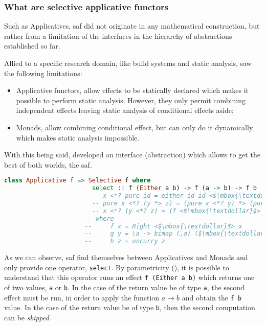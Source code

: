 \documentclass[
  oneside,
  11pt, a4paper,
  footinclude=true,
  headinclude=true,
  cleardoublepage=empty
]{scrbook}
\theoremstyle{definition}
\theoremstyle{definition}
\begin{document}
	        \subsubsection{What are selective applicative functors}
	       
	            Such as Applicatives, \gls{saf} did not originate in any mathematical construction, but rather from a limitation of the interfaces in the hierarchy of abstractions established so far.
	            
	            Allied to a specific research domain, like build systems and static analysis, \cite{andrey2019selective} saw the following limitations:
	            
	            \begin{itemize}
	                \item Applicative functors, allow effects to be statically declared which makes it possible to perform static analysis. However, they only permit combining independent effects leaving static analysis of conditional effects aside;
	                \item Monads, allow combining conditional effect, but can only do it dynamically which makes static analysis impossible.
	            \end{itemize}{}
	            
	            With this being said, \cite{andrey2019selective} developed an interface (abstraction) which allows to get the best of both worlds, the \gls{saf}.
	            
	            \begin{lstlisting}[mathescape, language=Haskell, label={lst:saf}, caption={Selective Applicative Functor laws},captionpos=b]
	                class Applicative f => Selective f where
	                    select :: f (Either a b) -> f (a -> b) -> f b
	                    -- x <*? pure id = either id id <$\mbox{\textdollar}$> x
	                    -- pure x <*? (y *> z) = (pure x <*? y) *> (pure x <*? z)
	                    -- x <*? (y <*? z) = (f <$\mbox{\textdollar}$> x) <*? (g <$\mbox{\textdollar}$> y) <*? (h <$\mbox{\textdollar}$> z)
                      -- where
                      --     f x = Right <$\mbox{\textdollar}$> x
                      --     g y = \a -> bimap (,a) ($\mbox{\textdollar}$a) y
                      --     h z = uncurry z
	            \end{lstlisting}{}
	            
	            As we can observe, \gls{saf} find themselves between Applicatives and Monads and only provide one operator, \texttt{select}. By parametricity (\cite{Wadler:1989:TF:99370.99404}), it is possible to understand that this operator runs an effect \texttt{f (Either a b)} which returns one of two values, \texttt{a} or \texttt{b}. In the case of the return value be of type \texttt{a}, the second effect must be run, in order to apply the function $a \rightarrow b$ and obtain the \texttt{f b} value. In the case of the return value be of type \texttt{b}, then the second computation can be \emph{skipped}.
	            
\end{document}
